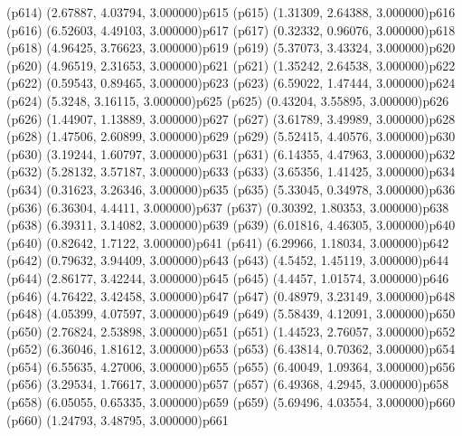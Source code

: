\psdot(p614)
\psPoint(2.67887, 4.03794, 3.000000){p615}
\psdot(p615)
\psPoint(1.31309, 2.64388, 3.000000){p616}
\psdot(p616)
\psPoint(6.52603, 4.49103, 3.000000){p617}
\psdot(p617)
\psPoint(0.32332, 0.96076, 3.000000){p618}
\psdot(p618)
\psPoint(4.96425, 3.76623, 3.000000){p619}
\psdot(p619)
\psPoint(5.37073, 3.43324, 3.000000){p620}
\psdot(p620)
\psPoint(4.96519, 2.31653, 3.000000){p621}
\psdot(p621)
\psPoint(1.35242, 2.64538, 3.000000){p622}
\psdot(p622)
\psPoint(0.59543, 0.89465, 3.000000){p623}
\psdot(p623)
\psPoint(6.59022, 1.47444, 3.000000){p624}
\psdot(p624)
\psPoint(5.3248, 3.16115, 3.000000){p625}
\psdot(p625)
\psPoint(0.43204, 3.55895, 3.000000){p626}
\psdot(p626)
\psPoint(1.44907, 1.13889, 3.000000){p627}
\psdot(p627)
\psPoint(3.61789, 3.49989, 3.000000){p628}
\psdot(p628)
\psPoint(1.47506, 2.60899, 3.000000){p629}
\psdot(p629)
\psPoint(5.52415, 4.40576, 3.000000){p630}
\psdot(p630)
\psPoint(3.19244, 1.60797, 3.000000){p631}
\psdot(p631)
\psPoint(6.14355, 4.47963, 3.000000){p632}
\psdot(p632)
\psPoint(5.28132, 3.57187, 3.000000){p633}
\psdot(p633)
\psPoint(3.65356, 1.41425, 3.000000){p634}
\psdot(p634)
\psPoint(0.31623, 3.26346, 3.000000){p635}
\psdot(p635)
\psPoint(5.33045, 0.34978, 3.000000){p636}
\psdot(p636)
\psPoint(6.36304, 4.4411, 3.000000){p637}
\psdot(p637)
\psPoint(0.30392, 1.80353, 3.000000){p638}
\psdot(p638)
\psPoint(6.39311, 3.14082, 3.000000){p639}
\psdot(p639)
\psPoint(6.01816, 4.46305, 3.000000){p640}
\psdot(p640)
\psPoint(0.82642, 1.7122, 3.000000){p641}
\psdot(p641)
\psPoint(6.29966, 1.18034, 3.000000){p642}
\psdot(p642)
\psPoint(0.79632, 3.94409, 3.000000){p643}
\psdot(p643)
\psPoint(4.5452, 1.45119, 3.000000){p644}
\psdot(p644)
\psPoint(2.86177, 3.42244, 3.000000){p645}
\psdot(p645)
\psPoint(4.4457, 1.01574, 3.000000){p646}
\psdot(p646)
\psPoint(4.76422, 3.42458, 3.000000){p647}
\psdot(p647)
\psPoint(0.48979, 3.23149, 3.000000){p648}
\psdot(p648)
\psPoint(4.05399, 4.07597, 3.000000){p649}
\psdot(p649)
\psPoint(5.58439, 4.12091, 3.000000){p650}
\psdot(p650)
\psPoint(2.76824, 2.53898, 3.000000){p651}
\psdot(p651)
\psPoint(1.44523, 2.76057, 3.000000){p652}
\psdot(p652)
\psPoint(6.36046, 1.81612, 3.000000){p653}
\psdot(p653)
\psPoint(6.43814, 0.70362, 3.000000){p654}
\psdot(p654)
\psPoint(6.55635, 4.27006, 3.000000){p655}
\psdot(p655)
\psPoint(6.40049, 1.09364, 3.000000){p656}
\psdot(p656)
\psPoint(3.29534, 1.76617, 3.000000){p657}
\psdot(p657)
\psPoint(6.49368, 4.2945, 3.000000){p658}
\psdot(p658)
\psPoint(6.05055, 0.65335, 3.000000){p659}
\psdot(p659)
\psPoint(5.69496, 4.03554, 3.000000){p660}
\psdot(p660)
\psPoint(1.24793, 3.48795, 3.000000){p661}

